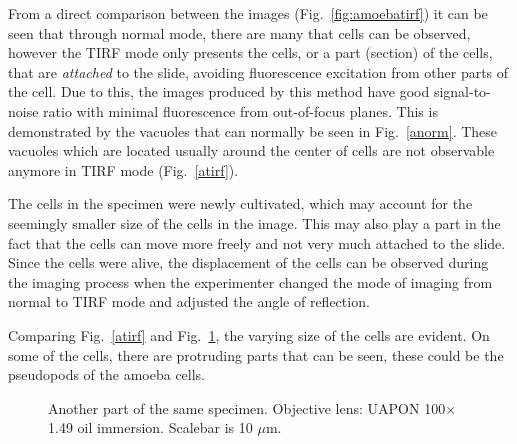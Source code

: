 From a direct comparison between the images (Fig.~\ref{fig:amoebatirf}) it can be seen that through normal mode, there are many that cells can be observed, however the TIRF mode only presents the cells, or a part (section) of the cells, that are \textit{attached} to the slide, avoiding fluorescence excitation from other parts of the cell. 
Due to this, the images produced by this method have good signal-to-noise ratio with minimal fluorescence from out-of-focus planes. 
This is demonstrated by the vacuoles that can normally be seen in Fig.~\ref{anorm}. These vacuoles which are located usually around the center of cells are not observable anymore in TIRF mode (Fig.~\ref{atirf}).

The cells in the specimen were newly cultivated, which may account for the seemingly smaller size of the cells in the image. 
This may also play a part in the fact that the cells can move more freely and not very much attached to the slide. 
Since the cells were alive, the displacement of the cells can be observed during the imaging process when the experimenter changed the mode of imaging from normal to TIRF mode and adjusted the angle of reflection.

Comparing Fig.~\ref{atirf} and Fig.~\ref{fig:amoebatirfb}, the varying size of the cells are evident. 
On some of the cells, there are protruding parts that can be seen, these could be the pseudopods of the amoeba cells.

\begin{figure}[h]
\centering
{}
\caption{Another part of the same specimen. 
Objective lens: UAPON 100$\times$ 1.49 oil immersion. 
Scalebar is 10 $\mu$m.}
\label{fig:amoebatirfb}
\end{figure}
 



%



